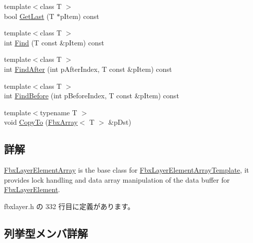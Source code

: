 \begin{DoxyCompactItemize}
\item 
{\footnotesize template$<$class T $>$ }\\bool \hyperlink{class_fbx_layer_element_array_a151426ccb1c4c28550c637716fdb7b64}{Get\+Last} (T $\ast$p\+Item) const
\item 
{\footnotesize template$<$class T $>$ }\\int \hyperlink{class_fbx_layer_element_array_a8dcc42ae3b8a351a1d5204a416fe72de}{Find} (T const \&p\+Item) const
\item 
{\footnotesize template$<$class T $>$ }\\int \hyperlink{class_fbx_layer_element_array_a6f33a669f8e1d538ff753db1b9378dcc}{Find\+After} (int p\+After\+Index, T const \&p\+Item) const
\item 
{\footnotesize template$<$class T $>$ }\\int \hyperlink{class_fbx_layer_element_array_a4fa63bc33b1de09a7d1b8be32b84b06c}{Find\+Before} (int p\+Before\+Index, T const \&p\+Item) const
\item 
{\footnotesize template$<$typename T $>$ }\\void \hyperlink{class_fbx_layer_element_array_a64ddf869251ef992f995a5bb9c16efcc}{Copy\+To} (\hyperlink{class_fbx_array}{Fbx\+Array}$<$ T $>$ \&p\+Dst)
\end{DoxyCompactItemize}


\subsection{詳解}
\hyperlink{class_fbx_layer_element_array}{Fbx\+Layer\+Element\+Array} is the base class for \hyperlink{class_fbx_layer_element_array_template}{Fbx\+Layer\+Element\+Array\+Template}, it provides lock handling and data array manipulation of the data buffer for \hyperlink{class_fbx_layer_element}{Fbx\+Layer\+Element}. 

 fbxlayer.\+h の 332 行目に定義があります。



\subsection{列挙型メンバ詳解}
\mbox{\label{class_fbx_layer_element_array_a8968b1fb337f924d0e9ca87302b54d70}} 
